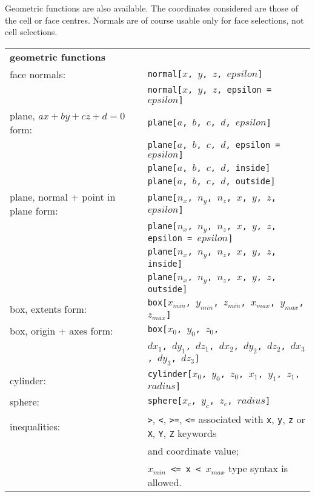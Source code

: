 {{{{Geometric functions are also available. The coordinates considered are
those of the cell or face centres. Normals are of course
usable only for face selections, not cell selections.

\begin{tabular}[top]{p{6cm} l}
\multicolumn{2}{l}{\bf geometric functions }\\
face normals:   &  \texttt{normal[$x$, $y$, $z$, $epsilon$]} \\
                &  \texttt{normal[$x$, $y$, $z$, epsilon = $epsilon$]} \\
plane, $ax + by + cz + d = 0$ form: &  \texttt{plane[$a$, $b$, $c$, $d$, $epsilon$]} \\
                &  \texttt{plane[$a$, $b$, $c$, $d$, epsilon = $epsilon$]} \\
                &  \texttt{plane[$a$, $b$, $c$, $d$, inside]} \\
                &  \texttt{plane[$a$, $b$, $c$, $d$, outside]} \\
plane, normal + point in plane form: &  \texttt{plane[$n_x$, $n_y$, $n_z$, $x$, $y$, $z$, $epsilon$]} \\
                &  \texttt{plane[$n_x$, $n_y$, $n_z$, $x$, $y$, $z$, epsilon = $epsilon$]} \\
                &  \texttt{plane[$n_x$, $n_y$, $n_z$, $x$, $y$, $z$, inside]} \\
                &  \texttt{plane[$n_x$, $n_y$, $n_z$, $x$, $y$, $z$, outside]} \\
box, extents form: &  \texttt{box[$x_{min}$, $y_{min}$, $z_{min}$,
                                  $x_{max}$, $y_{max}$, $z_{max}$]} \\
box, origin + axes form: &  \texttt{box[$x_0$, $y_0$, $z_0$,}\\
                         &  \texttt{\qquad $dx_1$, $dy_1$, $dz_1$,
                                        $dx_2$, $dy_2$, $dz_2$,
                                        $dx_3$, $dy_3$, $dz_3$]} \\
cylinder:       &  \texttt{cylinder[$x_0$, $y_0$, $z_0$, $x_1$, $y_1$, $z_1$, $radius$]} \\
sphere:         &  \texttt{sphere[$x_c$, $y_c$, $z_c$, $radius$]} \\
inequalities:   &  \texttt{>}, \texttt{<}, \texttt{>=}, \texttt{<=} associated
                   with \texttt{x}, \texttt{y}, \texttt{z}  or
                   \texttt{X}, \texttt{Y}, \texttt{Z} keywords\\
                &   and coordinate value; \\
                &  \texttt{$x_{min}$ <= x < $x_{max}$} type syntax is allowed. \\
\end{tabular}

}}}}
